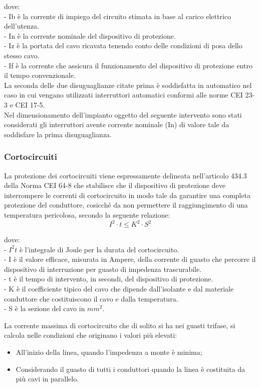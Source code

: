 dove: \\
- Ib è la corrente di impiego del circuito stimata in base al carico elettrico dell’utenza. \\
- In è la corrente nominale del dispositivo di protezione. \\
- Iz è la portata del cavo ricavata tenendo conto delle condizioni di posa dello stesso cavo. \\
- If è la corrente che assicura il funzionamento del dispositivo di protezione entro il tempo convenzionale. \\
La seconda delle due disuguaglianze citate prima è soddisfatta in automatico nel caso in cui vengano utilizzati interruttori automatici conformi alle norme CEI 23-3 e CEI 17-5. \\
Nel dimensionamento dell’impianto oggetto del seguente intervento sono stati considerati gli interruttori avente corrente nominale (In) di valore tale da soddisfare la prima disuguaglianza.



\subsubsection{Cortocircuiti}
La protezione dei cortocircuiti viene espressamente delineata nell’articolo 434.3 della Norma CEI 64-8 che stabilisce che il dispositivo di protezione deve interrompere le correnti di cortocircuito in modo tale da garantire una completa protezione del conduttore, cosicché da non permettere il raggiungimento di una temperatura pericolosa, secondo la seguente relazione: 
\[ I^2 \cdot t \leq K^2 \cdot S^2 \]

dove: \\
- $I^2 t$ è l'integrale di Joule per la durata del cortocircuito. \\
- I è il valore efficace, misurata in Ampere, della corrente di guasto che percorre il dispositivo di interruzione per guasto di impedenza trascurabile. \\
- t è il tempo di intervento, in secondi, del dispositivo di protezione. \\
- K è il coefficiente tipico del cavo che dipende dall’isolante e dal materiale conduttore che costituiscono il cavo e dalla temperatura. \\
- S è la sezione del cavo in $mm^2$.

La corrente massima di cortocircuito che di solito si ha nei guasti trifase, si calcola nelle condizioni che originano i valori più elevati:
\begin{itemize}
    \item All’inizio della linea, quando l’impedenza a monte è minima;
    \item Considerando il guasto di tutti i conduttori quando la linea è costituita da più cavi in parallelo.
\end{itemize}


